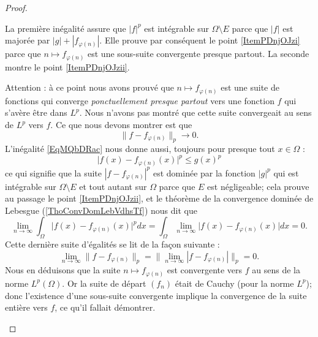 \begin{proof}
\begin{subproof}
        La première inégalité assure que \( | f |^p\) est intégrable sur \( \Omega\setminus E\) parce que \( | f |\) est majorée par \( | g |+| f_{\varphi(n)} |\). Elle prouve par conséquent le point \ref{ItemPDnjOJzi} parce que \(n\mapsto f_{\varphi(n)}\) est une sous-suite convergente presque partout. La seconde montre le point \ref{ItemPDnjOJzii}.

        Attention : à ce point nous avons prouvé que \( n\mapsto f_{\varphi(n)}\) est une suite de fonctions qui converge \emph{ponctuellement presque partout} vers une fonction \( f\) qui s'avère être dans \( L^p\). Nous n'avons pas montré que cette suite convergeait au sens de \( L^p\) vers \( f\). Ce que nous devons montrer est que
        \begin{equation}    \label{EqJLfnEvj}
            \| f-f_{\varphi(n)} \|_p\to 0.
        \end{equation}
        L'inégalité \eqref{EqMQbDRac} nous donne aussi, toujours pour presque tout \( x\in \Omega\) :
        \begin{equation}
            \big| f(x)-f_{\varphi(n)}(x) \big|^p\leq g(x)^p
        \end{equation}
        ce qui signifie que la suite \(    | f-f_{\varphi(n)} |^p    \) est dominée par la fonction \( | g |^p\) qui est intégrable sur \( \Omega\setminus E\) et tout autant sur \( \Omega\) parce que \( E\) est négligeable; cela prouve au passage le point \ref{ItemPDnjOJzii}, et le théorème de la convergence dominée de Lebesgue (\ref{ThoConvDomLebVdhsTf}) nous dit que
        \begin{equation}
            \lim_{n\to \infty} \int_{\Omega} \big| f(x)-f_{\varphi(n)}(x) \big|^pdx=\int_{\Omega}\lim_{n\to \infty} \big| f(x)-f_{\varphi(n)}(x) \big|dx=0.
        \end{equation}
        Cette dernière suite d'égalités se lit de la façon suivante :
        \begin{equation}
            \lim_{n\to \infty} \| f-f_{\varphi(n)} \|_p=\big\| \lim_{n\to \infty} | f-f_{\varphi(n)} | \big\|_p=0.
        \end{equation}
        Nous en déduisons que la suite \( n\mapsto f_{\varphi(n)}\) est convergente vers \( f\) au sens de la norme \( L^p(\Omega)\). Or la suite de départ \( (f_n)\) était de Cauchy (pour la norme \( L^p\)); donc l'existence d'une sous-suite convergente implique la convergence de la suite entière vers \( f\), ce qu'il fallait démontrer.
    \end{subproof}
\end{proof}

